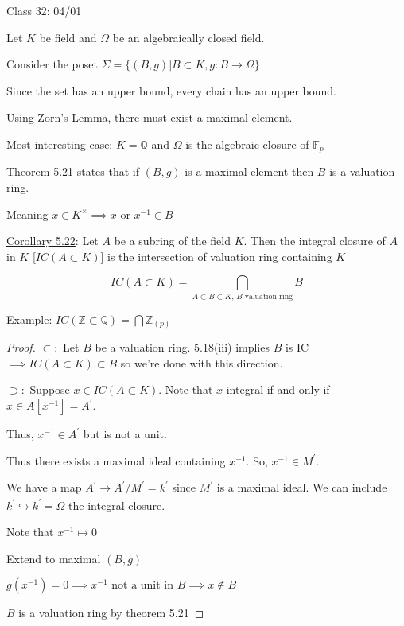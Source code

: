 \documentclass{article}
\theoremstyle{definition}
\begin{document}
\hrulefill

Class 32: 04/01

Let \(K\) be  field and \(\Omega\) be an algebraically closed field. 

Consider the poset \(\Sigma = \{ (B,g) | B \subset K, g:B \to \Omega \} \) 

Since the set has an upper bound, every chain has an upper bound.

Using Zorn's Lemma, there must exist a maximal element.

Most interesting case: \(K = \mathbb{Q}\) and \(\Omega\) is the algebraic closure of \(\mathbb{F}_p\)   

Theorem 5.21 states that if \((B,g)\) is a maximal element then \(B\) is a valuation ring.

Meaning \(x\in K^\times \implies x\) or \(x ^{-1}\in B\)  

\underline{Corollary 5.22}: Let \(A\) be a subring of the field \(K\). Then the integral closure of \(A\) in \(K\) [\(IC(A \subset K)\)] is the intersection of valuation ring containing \(K\) 

\[
    IC(A \subset K) = \bigcap_{A \subset B \subset K\text{, \(B\) valuation ring} } B
\]

Example: \(IC(\mathbb{Z} \subset \mathbb{Q})=\bigcap \mathbb{Z}_{(p)}\) 

\begin{proof}
    \(\subset :\) Let \(B\) be a valuation ring. 5.18(iii) implies \(B\) is IC \(\implies IC (A \subset K) \subset B\) so we're done with this direction.
    
    \(\supset :\) Suppose \(x\in IC(A \subset K)\). Note that \(x\) integral if and only if \(x\in A[x^{-1}] = A^{\prime}\).
    
    Thus, \(x ^{-1} \in A^{\prime}\) but is not a unit.
    
    Thus there exists a maximal ideal containing \(x ^{-1}\). So, \(x ^{-1} \in M^{\prime}\).
    
    We have a map \(A^{\prime} \to A^{\prime} / M^{\prime} = k^{\prime} \) since \(M^{\prime}\) is a maximal ideal. We can include \(k^{\prime} \hookrightarrow \overline{k^{\prime}}=\Omega\) the integral closure.
    
    Note that \(x ^{-1} \mapsto 0\)
    
    Extend to maximal \((B,g)\)
    
    \(g(x ^{-1}) = 0 \implies x ^{-1} \text{ not a unit in } B \implies x\notin B\)

    \(B\) is a valuation ring by theorem 5.21
    
\end{proof}
\end{document}
